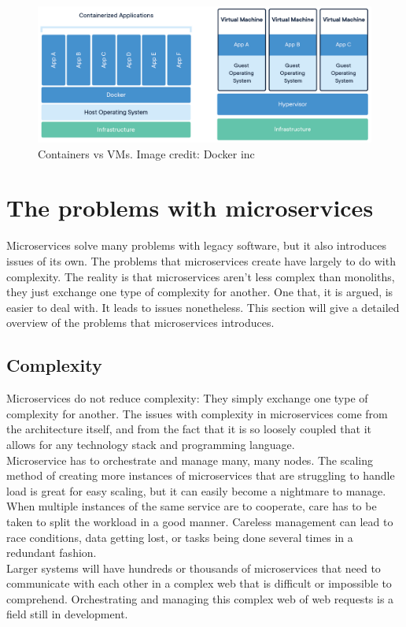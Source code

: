 \begin{figure}[ht]
    \centering
    \includegraphics[width=\columnwidth]{Figures/containers_vs_VMs.png}
    \caption{Containers vs VMs. Image credit: Docker inc}
    \label{Containers}
\end{figure}

\section{The problems with microservices}
Microservices solve many problems with legacy software, but it also introduces issues of its own.
The problems that microservices create have largely to do with complexity.
The reality is that microservices aren't less complex than monoliths, they just exchange one type of complexity for another.
One that, it is argued, is easier to deal with. It leads to issues nonetheless.
This section will give a detailed overview of the problems that microservices introduces.

\subsection{Complexity}
Microservices do not reduce complexity: They simply exchange one type of complexity for another.
The issues with complexity in microservices come from the architecture itself, and from the fact that it is so loosely coupled that it allows for any technology stack and programming language.\\
Microservice has to orchestrate and manage many, many nodes.
The scaling method of creating more instances of microservices that are struggling to handle load is great for easy scaling, but it can easily become a nightmare to manage.
When multiple instances of the same service are to cooperate, care has to be taken to split the workload in a good manner.
Careless management can lead to race conditions, data getting lost, or tasks being done several times in a redundant fashion.\\
Larger systems will have hundreds or thousands of microservices that need to communicate with each other in a complex web that is difficult or impossible to comprehend.
Orchestrating and managing this complex web of web requests is a field still in development.

